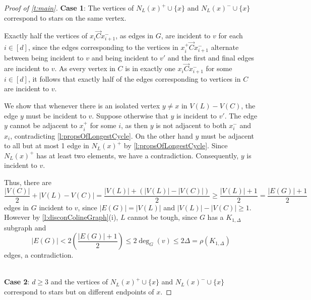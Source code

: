 \documentclass[12pt]{article}
\theoremstyle{definition}
\newcommand{\ora}{\overrightarrow{C}}
\begin{document}
\begin{proof}[Proof of \cref{t:main}]
\noindent \textbf{Case 1}: The vertices of $N_L(x)^+\cup\{x\}$ and $N_L(x)^-\cup \{ x\}$ correspond to stars on the same vertex. %

Exactly half the vertices  of $x_i \ora x_{i+1}^-$, as edges in $G$, are incident to $v$ for each $i \in [d]$, since the edges corresponding to the vertices in $x_i^+ \ora x_{i+1}^-$ alternate between being incident to $v$ and being incident to $v'$ and the first and final edges are incident to $v$. 
As every vertex in $C$ is in exactly one $x_i \ora x_{i+1}^-$ for some $i\in [d]$, it follows that exactly half of the edges corresponding to vertices in $C$ are incident to $v$.

We show that whenever there is an isolated vertex $y \neq x$ in $V(L)-V(C)$, the edge $y$ must be incident to $v$. Suppose otherwise that $y$ is incident to $v'$. 
The edge $y$ cannot be adjacent to $x_i^+$ for some $i$, as then $y$ is not adjacent to both $x_i^-$ and $x_i$, contradicting \cref{l:propsOfLongestCycle}. On the other hand
$y$ must be adjacent to all but at most 1 edge in $N_L(x)^+$ by \cref{l:propsOfLongestCycle}. Since $N_L(x)^+$ has at least two elements, we have a contradiction. Consequently, $y$ is incident to $v$.

Thus, there are 
\[
\frac{|V(C)|}{2}+|V(L)-V(C)|  = \frac{|V(L)|+(|V(L)|-|V(C)|)}{2}\geq \frac{|V(L)|+1}{2} = \frac{|E(G)|+1}{2}
\] 
edges in $G$ incident to $v$, since $|E(G)|=|V(L)|$ and $|V(L)|-|V(C)| \geq 1$.
However by \cref{l:disconColineGraph}(i), $L$ cannot be tough, since $G$ has a $K_{1,\Delta}$ subgraph and 
\[
|E(G)| < 2\left(\frac{|E(G)|+1}{2} \right)\leq 2\deg_G(v) \leq 2\Delta = \rho(K_{1,\Delta})
\]
edges, a contradiction.

$ $
\\
\noindent \textbf{Case 2}: $d\geq 3$ and the vertices of $N_L(x)^+ \cup \{x\}$ and $N_L(x)^- \cup \{x\}$ correspond to stars but on different endpoints of $x$.


\end{proof}
\end{document}

